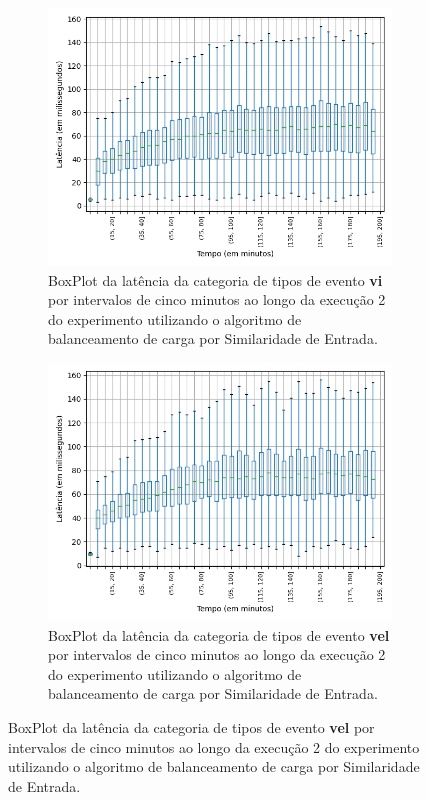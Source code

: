 \begin{figure}
\begin{subfigure}{.5\textwidth}
\centering
\includegraphics[width=\textwidth]{figuras/graphics/boxplot_7-dez-is_vi.png}
\caption{BoxPlot da latência da categoria de tipos de evento \textbf{vi} por intervalos de cinco minutos ao longo da execução 2 do experimento utilizando o algoritmo de balanceamento de carga por Similaridade de Entrada.}
\label{fig:BoxPlot_vi_IS_7-dez-is}
\end{subfigure}%
\centering
\begin{subfigure}{.5\textwidth}
\centering
\includegraphics[width=\textwidth]{figuras/graphics/boxplot_7-dez-is_vel.png}
\caption{BoxPlot da latência da categoria de tipos de evento \textbf{vel} por intervalos de cinco minutos ao longo da execução 2 do experimento utilizando o algoritmo de balanceamento de carga por Similaridade de Entrada.}
\label{fig:BoxPlot_vel_IS_7-dez-is}
\end{subfigure}%


\end{figure}
